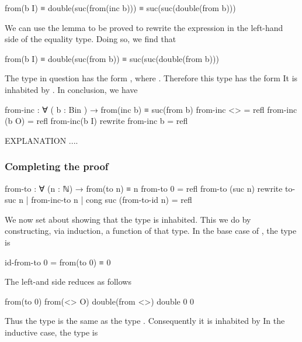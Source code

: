 \begin{colored}[elm]
from(b I) ≡ double(suc(from(inc b))) ≡ suc(suc(double(from b))) 
\end{colored}

We can use the lemma to be proved to rewrite the expression  in the left-hand side of the equality type.  Doing so, we find that

\begin{colored}[elm]
from(b I) ≡ double(suc(from b)) ≡ suc(suc(double(from b))) 
\end{colored}

The type in question has the form , where .  Therefore this type has the form   It is inhabited by . In conclusion, we have 

\begin{colored}[elm]
from-inc : ∀ ( b : Bin ) → from(inc b) ≡ suc(from b)
from-inc <> = refl
from-inc (b O)  = refl
from-inc(b I) rewrite from-inc b = refl
\end{colored}

EXPLANATION ....

\subsubsection{Completing the proof}

\begin{colored}[elm]
from-to : ∀ (n : ℕ) → from(to n) ≡ n
from-to 0 = refl
from-to (suc n) rewrite to-suc n | from-inc-to n | 
    cong suc (from-to-id n) = refl

\end{colored}





We now set about showing that the type  is inhabited.  This we do by constructing, via induction, a function of that type.  In the base case of , the type is

\begin{colored}[elm]
id-from-to 0 = from(to 0) ≡ 0
\end{colored}

The left-and side reduces as follows

\begin{colored}[elm]
from(to 0)
from(<> O)
double(from <>)
double 0
0
\end{colored}

Thus the type  is the same as the type .  Consequently it is inhabited by  In the inductive case, the type is

